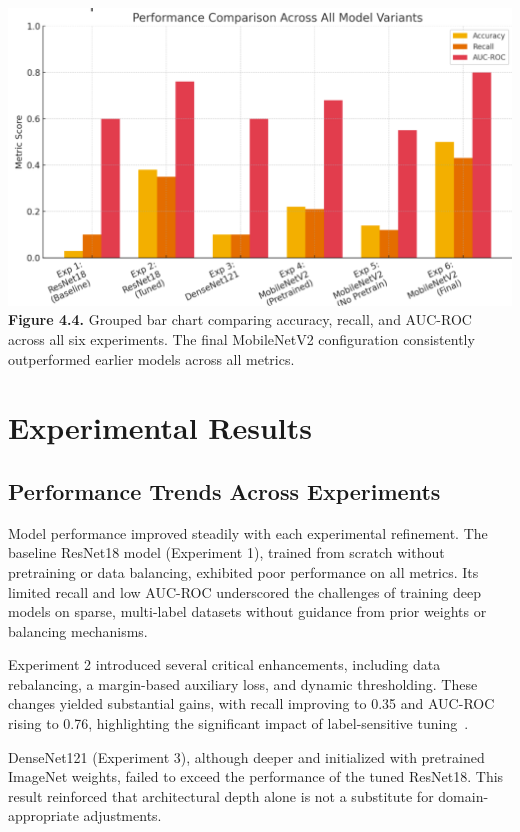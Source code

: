 \documentclass[12pt]{article}
\begin{document}
\begin{multicols}{2}
\begin{center}
    \includegraphics[width=\linewidth]{figure4.4.png}
    \textbf{Figure 4.4.} Grouped bar chart comparing accuracy, recall, and AUC-ROC across all six experiments. The final MobileNetV2 configuration consistently outperformed earlier models across all metrics.
\end{center}

\section{Experimental Results}

\subsection{Performance Trends Across Experiments}
Model performance improved steadily with each experimental refinement. The baseline ResNet18 model (Experiment 1), trained from scratch without pretraining or data balancing, exhibited poor performance on all metrics. Its limited recall and low AUC-ROC underscored the challenges of training deep models on sparse, multi-label datasets without guidance from prior weights or balancing mechanisms.

Experiment 2 introduced several critical enhancements, including data rebalancing, a margin-based auxiliary loss, and dynamic thresholding. These changes yielded substantial gains, with recall improving to 0.35 and AUC-ROC rising to 0.76, highlighting the significant impact of label-sensitive tuning~\cite{12}.

DenseNet121 (Experiment 3), although deeper and initialized with pretrained ImageNet weights, failed to exceed the performance of the tuned ResNet18. This result reinforced that architectural depth alone is not a substitute for domain-appropriate adjustments.


\end{multicols}
\end{document}
